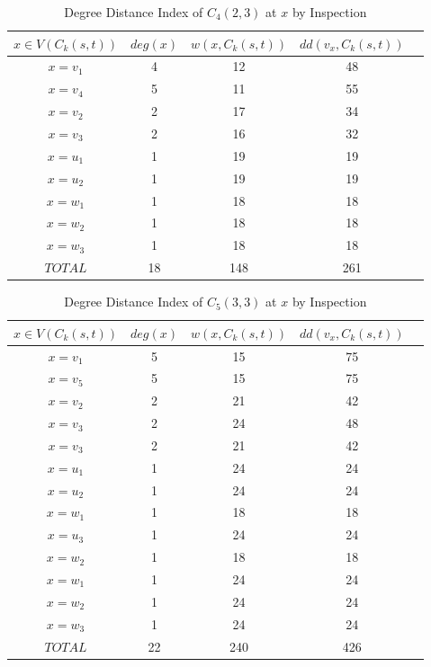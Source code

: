 \begin{e.g.}
\begin{table}[!ht]
\caption{Degree Distance Index of $C_4(2,3)$ at $x$ by Inspection}
\begin{center}
\begin{tabular}{|c|c|c|c|c|}
\hline 
$x\in V(C_k(s,t))$ & $deg (x)$ & $w(x,C_k(s,t))$ & $dd(v_x,C_k(s,t))$  \\ 
\hline 
$x=v_1$ & 4 & 12 & 48 \\ 
\hline 
$x=v_4$ & 5 & 11 & 55 \\ 
\hline 
$x=v_2$ & 2 & 17 & 34 \\ 
\hline 
$x=v_3$ & 2 & 16 & 32 \\ 
\hline 
$x=u_1$ & 1 & 19 & 19 \\ 
\hline 
$x=u_2$ & 1 & 19 & 19 \\ 
\hline
$x=w_1$ & 1 & 18 & 18 \\ 
\hline 
$x=w_2$ & 1 & 18 & 18 \\ 
\hline 
$x=w_3$ & 1 & 18 & 18 \\ 
\hline 
$TOTAL$ & 18 & 148 & 261 \\ 
\hline 
\end{tabular} 
\end{center}
\label{tab:DD_c4_inspection}
\end{table}

\newpage
\begin{table}[!ht]
\caption{Degree Distance Index of $C_5(3,3)$ at $x$ by Inspection}
\begin{center}
\begin{tabular}{|c|c|c|c|c|}
\hline 
$x\in V(C_k(s,t))$ & $deg (x)$ & $w(x,C_k(s,t))$ & $dd(v_x,C_k(s,t))$  \\ 
\hline 
$x=v_1$ & 5 & 15 & 75 \\ 
\hline 
$x=v_5$ & 5 & 15 & 75 \\ 
\hline 
$x=v_2$ & 2 & 21 & 42 \\ 
\hline 
$x=v_3$ & 2 & 24 & 48 \\ 
\hline 
$x=v_3$ & 2 & 21 & 42 \\ 
\hline 
$x=u_1$ & 1 & 24 & 24 \\ 
\hline 
$x=u_2$ & 1 & 24 & 24 \\ 
\hline 
$x=w_1$ & 1 & 18 & 18 \\ 
\hline
$x=u_3$ & 1 & 24 & 24 \\ 
\hline  
$x=w_2$ & 1 & 18 & 18 \\ 
\hline 
$x=w_1$ & 1 & 24 & 24 \\ 
\hline 
$x=w_2$ & 1 & 24 & 24 \\ 
\hline 
$x=w_3$ & 1 & 24 & 24 \\ 
\hline 
$TOTAL$ & 22 & 240 & 426 \\ 
\hline 
\end{tabular} 
\end{center}
\label{tab:DD_c4_inspection}
\end{table}


\end{e.g.}
